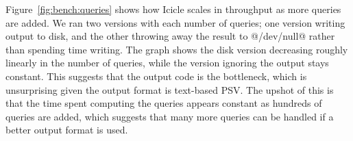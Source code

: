 

Figure~\ref{fig:bench:queries} shows how Icicle scales in throughput as more queries are added.
We ran two versions with each number of queries; one version writing output to disk, and the other throwing away the result to @/dev/null@ rather than spending time writing.
The graph shows the disk version decreasing roughly linearly in the number of queries, while the version ignoring the output stays constant.
This suggests that the output code is the bottleneck, which is unsurprising given the output format is text-based PSV.
The upshot of this is that the time spent computing the queries appears constant as hundreds of queries are added, which suggests that many more queries can be handled if a better output format is used.


